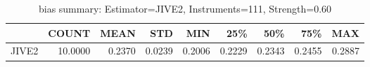 \begin{table}[ht]
\centering
\caption{bias summary: Estimator=JIVE2, Instruments=111, Strength=0.60}
\begin{tabular}{lrrrrrrrr}
\toprule
 & COUNT & MEAN & STD & MIN & 25\% & 50\% & 75\% & MAX \\
\midrule
JIVE2 & 10.0000 & 0.2370 & 0.0239 & 0.2006 & 0.2229 & 0.2343 & 0.2455 & 0.2887 \\
\bottomrule
\end{tabular}
\end{table}

